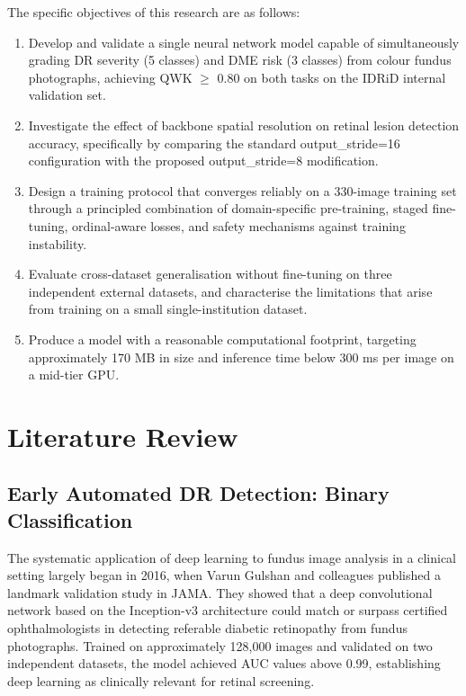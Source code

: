 \documentclass[12pt,a4paper]{article}
\begin{document}
The specific objectives of this research are as follows:

\begin{enumerate}[leftmargin=2em, label=\textbf{O\arabic*.}]
    \item Develop and validate a single neural network model capable of simultaneously grading DR severity (5 classes) and DME risk (3 classes) from colour fundus photographs, achieving QWK $\geq$ 0.80 on both tasks on the IDRiD internal validation set.

    \item Investigate the effect of backbone spatial resolution on retinal lesion detection accuracy, specifically by comparing the standard output\_stride=16 configuration with the proposed output\_stride=8 modification.

    \item Design a training protocol that converges reliably on a 330-image training set through a principled combination of domain-specific pre-training, staged fine-tuning, ordinal-aware losses, and safety mechanisms against training instability.

    \item Evaluate cross-dataset generalisation without fine-tuning on three independent external datasets, and characterise the limitations that arise from training on a small single-institution dataset.

    \item Produce a model with a reasonable computational footprint, targeting approximately 170 MB in size and inference time below 300 ms per image on a mid-tier GPU.
\end{enumerate}


\section{Literature Review}

\subsection{Early Automated DR Detection: Binary Classification}

The systematic application of deep learning to fundus image analysis in a clinical setting largely began in 2016, when Varun Gulshan and colleagues published a landmark validation study in JAMA. They showed that a deep convolutional network based on the Inception-v3 architecture could match or surpass certified ophthalmologists in detecting referable diabetic retinopathy from fundus photographs. Trained on approximately 128,000 images and validated on two independent datasets, the model achieved AUC values above 0.99, establishing deep learning as clinically relevant for retinal screening.
\end{document}
